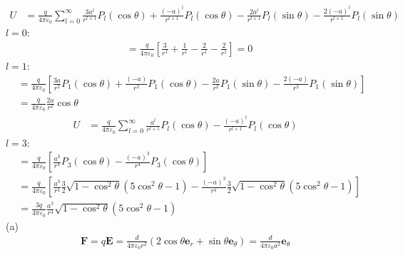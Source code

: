 \begin{align*}
    U&=\frac{q}{4\pi\varepsilon_0}\sum_{l=0}^{\infty}
    \frac{3a^l}{r^{l+1}}P_l(\cos\theta)
    +\frac{(-a)^l}{r^{l+1}}P_l(\cos\theta)
    -\frac{2a^l}{r^{l+1}}P_l(\sin\theta)
    -\frac{2(-a)^l}{r^{l+1}}P_l(\sin\theta)
\end{align*}
$l=0$:
\begin{align*}
    &=\frac{q}{4\pi\varepsilon_0}\left[
    \frac{3}{r^{1}}
    +\frac{1}{r^{1}}
    -\frac{2}{r^{1}}
    -\frac{2}{r^{1}}\right]=0
\end{align*}
$l=1$:
\begin{align*}
    &=\frac{q}{4\pi\varepsilon_0}\left[
    \frac{3a}{r^{2}}P_1(\cos\theta)
    +\frac{(-a)}{r^{2}}P_1(\cos\theta)
    -\frac{2a}{r^{2}}P_1(\sin\theta)
    -\frac{2(-a)}{r^{2}}P_1(\sin\theta)\right]\\
    &=\frac{q}{4\pi\varepsilon_0}
    \frac{2a}{r^{2}}\cos\theta
\end{align*}
\begin{align*}
    U&=\frac{q}{4\pi\varepsilon_0}\sum_{l=0}^{\infty}
    \frac{a^l}{r^{l+1}}P_l(\cos\theta)
    -\frac{(-a)^l}{r^{l+1}}P_l(\cos\theta)
\end{align*}
$l=3$:
\begin{align*}
    &=\frac{q}{4\pi\varepsilon_0}\left[
    \frac{a^3}{r^{4}}P_3(\cos\theta)
    -\frac{(-a)^3}{r^{4}}P_3(\cos\theta)\right]\\
    &=\frac{q}{4\pi\varepsilon_0}\left[
    \frac{a^3}{r^{4}}\frac{3}{2}\sqrt{1-\cos^2\theta}(5\cos^2\theta-1)
    -\frac{(-a)^3}{r^{4}}\frac{3}{2}\sqrt{1-\cos^2\theta}(5\cos^2\theta-1)\right]\\
    &=\frac{3q}{4\pi\varepsilon_0}
    \frac{a^3}{r^{4}}\sqrt{1-\cos^2\theta}(5\cos^2\theta-1)
\end{align*}
(a)
\begin{align*}
    \boldsymbol F
    =q\boldsymbol E
    =\frac{d}{4\pi\varepsilon_0r^2}(2\cos\theta\boldsymbol{e}_r+\sin\theta\boldsymbol{e}_\theta)
    =\frac{d}{4\pi\varepsilon_0a^2}\boldsymbol{e}_\theta
\end{align*}

